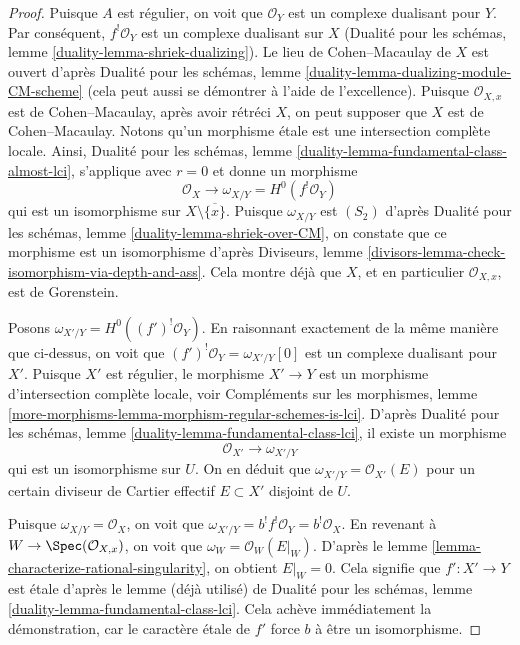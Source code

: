 \begin{proof}
\medskip\noindent
Puisque $A$ est régulier, on voit que $\mathcal{O}_Y$ est un complexe dualisant pour $Y$.
Par conséquent, $f^!\mathcal{O}_Y$ est un complexe dualisant sur $X$
(Dualité pour les schémas, lemme \ref{duality-lemma-shriek-dualizing}).
Le lieu de Cohen--Macaulay de $X$ est ouvert d'après
Dualité pour les schémas, lemme \ref{duality-lemma-dualizing-module-CM-scheme}
(cela peut aussi se démontrer à l'aide de l'excellence).
Puisque $\mathcal{O}_{X, x}$ est de Cohen--Macaulay, après avoir rétréci
$X$, on peut supposer que $X$ est de Cohen--Macaulay.
Notons qu'un morphisme \'etale est une intersection complète locale.
Ainsi,
Dualité pour les schémas, lemme \ref{duality-lemma-fundamental-class-almost-lci},
s'applique avec $r = 0$ et donne un morphisme
$$
\mathcal{O}_X \longrightarrow \omega_{X/Y} = H^0(f^!\mathcal{O}_Y)
$$
qui est un isomorphisme sur $X \setminus \overline{\{x\}}$.
Puisque $\omega_{X/Y}$ est $(S_2)$ d'après
Dualité pour les schémas, lemme \ref{duality-lemma-shriek-over-CM},
on constate que ce morphisme est un isomorphisme d'après
Diviseurs, lemme \ref{divisors-lemma-check-isomorphism-via-depth-and-ass}.
Cela montre déjà que $X$, et en particulier $\mathcal{O}_{X, x}$, est
de Gorenstein.

\medskip\noindent
Posons $\omega_{X'/Y} = H^0((f')^!\mathcal{O}_Y)$. En raisonnant exactement de la
même manière que ci-dessus, on voit que $(f')^!\mathcal{O}_Y = \omega_{X'/Y}[0]$
est un complexe dualisant pour $X'$. Puisque $X'$ est régulier,
le morphisme $X' \to Y$ est un morphisme d'intersection complète locale, voir
Compléments sur les morphismes, lemme
\ref{more-morphisms-lemma-morphism-regular-schemes-is-lci}.
D'après Dualité pour les schémas, lemme \ref{duality-lemma-fundamental-class-lci},
il existe un morphisme
$$
\mathcal{O}_{X'} \longrightarrow \omega_{X'/Y}
$$
qui est un isomorphisme sur $U$. On en déduit que
$\omega_{X'/Y} = \mathcal{O}_{X'}(E)$ pour un certain diviseur de
Cartier effectif $E \subset X'$ disjoint de $U$.

\medskip\noindent
Puisque $\omega_{X/Y} = \mathcal{O}_X$, on voit que
$\omega_{X'/Y} = b^! f^!\mathcal{O}_Y = b^!\mathcal{O}_X$.
En revenant à $W \to \Spec(\mathcal{O}_{X, x})$,
on voit que $\omega_W = \mathcal{O}_W(E|_W)$.
D'après le lemme \ref{lemma-characterize-rational-singularity},
on obtient $E|_W = 0$.
Cela signifie que $f' : X' \to Y$ est \'etale d'après le lemme (déjà utilisé)
de Dualité pour les schémas, lemme \ref{duality-lemma-fundamental-class-lci}.
Cela achève immédiatement la démonstration, car le caractère \'etale
de $f'$ force $b$ à être un isomorphisme.
\end{proof}


